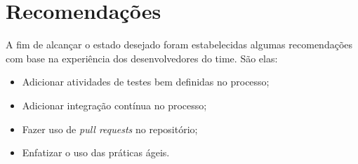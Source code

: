 	
\section{Recomendações}

A fim de alcançar o estado desejado foram estabelecidas algumas recomendações com base na experiência dos desenvolvedores do time.
São elas: 

\begin{itemize}
    \item Adicionar atividades de testes bem definidas no processo;
    \item Adicionar integração contínua no processo;
    \item Fazer uso de \textit{pull requests} no repositório;
    \item Enfatizar o uso das práticas ágeis.
\end{itemize}
